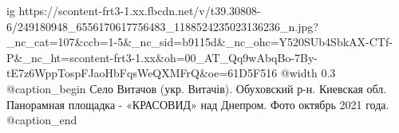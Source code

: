  
 
 
 
 

\ifcmt
  ig https://scontent-frt3-1.xx.fbcdn.net/v/t39.30808-6/249180948_6556170617756483_1188524235023136236_n.jpg?_nc_cat=107&ccb=1-5&_nc_sid=b9115d&_nc_ohc=Y520SUb4SbkAX-CTf-P&_nc_ht=scontent-frt3-1.xx&oh=00_AT_Qq9wAbqBo-7By-tE7z6WppTospFJaoHbFqsWeQXMFrQ&oe=61D5F516
  @width 0.3
  @caption_begin
    Село Витачов (укр. Витачів). Обуховский р-н. Киевская обл. 
    Панорамная площадка - «КРАСОВИД» над Днепром. Фото октябрь 2021 года.
  @caption_end
\fi

